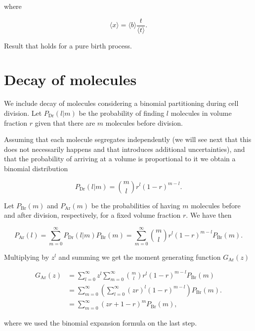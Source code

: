 where

\begin{equation}
  \langle x\rangle = \langle b\rangle\frac{t}{\langle t\rangle}.
\end{equation}

Result that holds for a pure birth process.

\section{Decay of molecules}

We include decay of molecules considering a binomial partitioning during cell division. Let $P_\text{Dr}(l|m)$ be the probability of finding $l$ molecules in volume fraction $r$ given that there are $m$ molecules before division.

Assuming that each molecule segregates independently (we will see next that this does not necessarily happens and that introduces additional uncertainties), and that the probability of arriving at a volume is proportional to it we obtain a binomial distribution

\begin{equation}
  P_\text{Dr}(l|m) = {m\choose l}r^l(1-r)^{m-l}.
\end{equation}

Let $P_\text{Br}(m)$ and $P_\text{Ar}(m)$ be the probabilities of having $m$ molecules before and after division, respectively, for a fixed volume fraction $r$. We have then

\begin{equation}
  P_\text{Ar}(l) = \sum_{m=0}^\infty P_\text{Dr}(l|m)P_\text{Br}(m) = \sum_{m=0}^\infty {m\choose l}r^l(1-r)^{m-l}P_\text{Br}(m).
\end{equation}

Multiplying by $z^l$ and summing we get the moment generating function $G_\text{Ar}(z)$

\begin{equation}
  \label{eq:binomG}
  \begin{split}
    G_\text{Ar}(z) &= \sum_{l=0}^\infty z^l\sum_{m=0}^\infty {m\choose l}r^l(1-r)^{m-l}P_\text{Br}(m)\\
    &= \sum_{m=0}^\infty\left(\sum_{l=0}^\infty (zr)^l(1-r)^{m-l}\right)P_\text{Br}(m).\\
    &= \sum_{m=0}^\infty(zr+1-r)^{m}P_\text{Br}(m),
  \end{split}
\end{equation}

where we used the binomial expansion formula on the last step.

